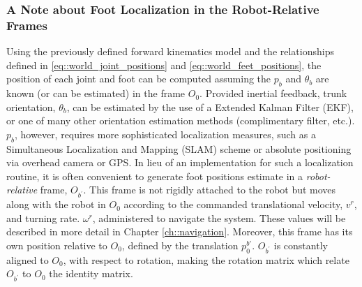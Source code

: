 			\subsubsection{A Note about Foot Localization in the Robot-Relative Frames}

			Using the previously defined forward kinematics model and the relationships defined in \ref{eq::world_joint_positions} and \ref{eq::world_feet_positions}, the position of each joint and foot can be computed assuming the $p_{b}$ and $\theta_{b}$ are known (or can be estimated) in the frame $O_{0}$. Provided inertial feedback, trunk orientation, $\theta_{b}$, can be estimated by the use of a Extended Kalman Filter (EKF), or one of many other orientation estimation methods (\IE complimentary filter, etc.). $p_{b}$, however, requires more sophisticated localization measures, such as a Simultaneous Localization and Mapping (SLAM) scheme or absolute positioning via overhead camera or GPS. In lieu of an implementation for such a localization routine, it is often convenient to generate foot positions estimate in a \emph{robot-relative} frame, $O_{b^{'}}$. This frame is not rigidly attached to the robot but moves along with the robot in $O_{0}$ according to the commanded translational velocity, $v^{r}$, and turning rate. $\omega^{r}$, administered to navigate the system. These values will be described in more detail in Chapter \ref{ch::navigation}. Moreover, this frame has its own position relative to $O_{0}$, defined by the translation $p_{0}^{b'}$. $O_{b^{'}}$ is constantly aligned to $O_{0}$, with respect to rotation, making the rotation matrix which relate $O_{b^{'}}$ to $O_{0}$ the identity matrix.

